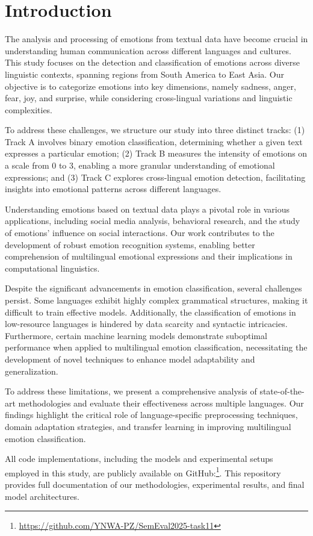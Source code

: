 \section{Introduction}
The analysis and processing of emotions from textual data have become crucial in understanding human communication across different languages and cultures. This study focuses on the detection and classification of emotions across diverse linguistic contexts, spanning regions from South America to East Asia. Our objective is to categorize emotions into key dimensions, namely sadness, anger, fear, joy, and surprise, while considering cross-lingual variations and linguistic complexities.

To address these challenges, we structure our study into three distinct tracks: (1) Track A involves binary emotion classification, determining whether a given text expresses a particular emotion; (2) Track B measures the intensity of emotions on a scale from 0 to 3, enabling a more granular understanding of emotional expressions; and (3) Track C explores cross-lingual emotion detection, facilitating insights into emotional patterns across different languages.

Understanding emotions based on textual data plays a pivotal role in various applications, including social media analysis, behavioral research, and the study of emotions' influence on social interactions. Our work contributes to the development of robust emotion recognition systems, enabling better comprehension of multilingual emotional expressions and their implications in computational linguistics.

Despite the significant advancements in emotion classification, several challenges persist. Some languages exhibit highly complex grammatical structures, making it difficult to train effective models. Additionally, the classification of emotions in low-resource languages is hindered by data scarcity and syntactic intricacies. Furthermore, certain machine learning models demonstrate suboptimal performance when applied to multilingual emotion classification, necessitating the development of novel techniques to enhance model adaptability and generalization.

To address these limitations, we present a comprehensive analysis of state-of-the-art methodologies and evaluate their effectiveness across multiple languages. Our findings highlight the critical role of language-specific preprocessing techniques, domain adaptation strategies, and transfer learning in improving multilingual emotion classification.

All code implementations, including the models and experimental setups employed in this study, are publicly available on GitHub:\footnote{\url{https://github.com/YNWA-PZ/SemEval2025-task11}}. This repository provides full documentation of our methodologies, experimental results, and final model architectures.